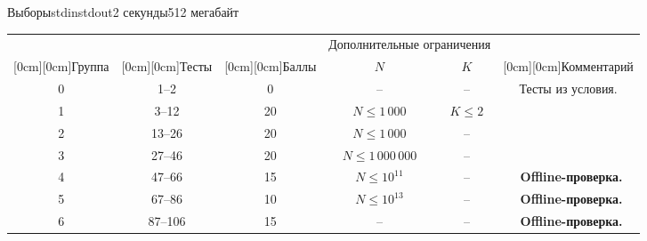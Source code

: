 \begin{problem}{Выборы}{stdin}{stdout}{2 секунды}{512 мегабайт}
\begin{tabular}{|c|c|c|c|c|c|}
\hline
& & & \multicolumn{2}{c|}{Дополнительные ограничения} & \\
\cline{4-5}
\raisebox{2.25ex}[0cm][0cm]{Группа} & 
\raisebox{2.25ex}[0cm][0cm]{Тесты} &
\raisebox{2.25ex}[0cm][0cm]{Баллы} &
$N$ & $K$  & \raisebox{2.25ex}[0cm][0cm]{Комментарий} \\
\hline
0 & 1--2 & 0  & --                & --                 & Тесты из условия. \\
\hline
1 & 3--12 & 20 & $N \leq 1\,000$       & $K \leq 2$        &  \\
\hline
2 & 13--26 & 20 & $N \leq 1\,000$     & --      &                    \\
\hline
3 & 27--46 & 20 & $N \leq 1\,000\,000$     & --   &\ \\
\hline
4 & 47--66 & 15 & $N \leq 10^{11}$     & --   &\ \textbf{Offline-проверка.} \\
\hline
5 & 67--86 & 10 & $N \leq 10^{13}$     & --   &\ \textbf{Offline-проверка.} \\
\hline
6 & 87--106 & 15 & --     & --   &\ \textbf{Offline-проверка.} \\
\hline
\end{tabular}

\endgroup

\end{problem}
